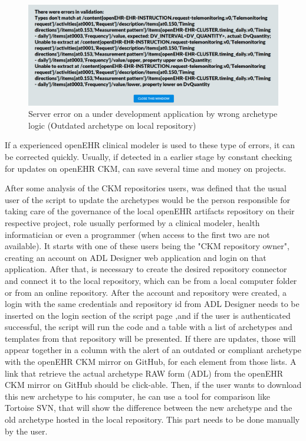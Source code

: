\documentclass[mim_thesis.tex]{subfiles}
\begin{document}
\begin{figure}[H]
	\centering
    \includegraphics[width=1\textwidth]{img/server_error.PNG}
	\caption{Server error on a under development application by wrong archetype logic (Outdated archetype on local repository)}
	\label{fig:server_arch_error}
\end{figure}

If a experienced openEHR clinical modeler is used to these type of errors, it can be corrected quickly. Usually, if detected in a earlier stage by constant checking for updates on openEHR CKM, can save several time and money on projects.

After some analysis of the CKM repositories users, was defined that the usual user of the script to update the archetypes would be the person responsible for taking care of the governance of the local openEHR artifacts repository on their respective project, role usually performed by a clinical modeler, health informatician or even a programmer (when access to the first two are not available). It starts with one of these users being the "CKM repository owner", creating an account on ADL Designer web application and login on that application. After that, is necessary to create the desired repository connector and connect it to the local repository, which can be from a local computer folder or from an online repository. After the account and repository were created, a login with the same credentials and repository id from ADL Designer needs to be inserted on the login section of the script page ,and if the user is authenticated successful, the script will run the code and a table with a list of archetypes and templates from that repository will be presented. If there are updates, those will appear together in a column with the alert of an outdated or compliant archetype with the openEHR CKM mirror on GitHub, for each element from those lists. A link that retrieve the actual archetype RAW form (ADL) from the openEHR CKM mirror on GitHub should be click-able. Then, if the user wants to download this new archetype to his computer, he can use a tool for comparison like Tortoise SVN, that will show the difference between the new archetype and the old archetype hosted in the local repository. This part needs to be done manually by the user. 
\end{document}
